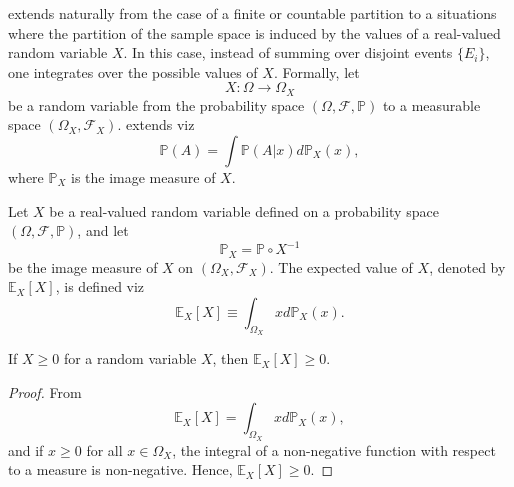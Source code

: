 \begin{remark}
	 extends naturally from the case of a finite or countable partition to a situations where the partition of the sample space is induced by the values of a real-valued random variable $X$. In this case, instead of summing over disjoint events $\{E_i\}$, one integrates over the possible values of $X$. Formally, let 
	\begin{equation}
		X: \Omega \to \Omega_X
	\end{equation}
	be a random variable from the probability space $(\Omega, \mathcal{F}, \mathbb{P})$ to a measurable space $(\Omega_X, \mathcal{F}_X)$.  extends viz
	\begin{equation}
		\mathbb{P}(A) = \int \mathbb{P}(A | x) d\mathbb{P}_X(x),
	\end{equation}
	where $\mathbb{P}_X$ is the image measure of $X$. 
\end{remark}

\begin{definition}
	\label{def:expectation_image}
	Let $X$ be a real-valued random variable defined on a probability space $(\Omega, \mathcal{F},\mathbb{P})$, and let
	\begin{equation}
		\mathbb{P}_X = \mathbb{P} \circ X^{-1}
	\end{equation} 
	be the image measure of $X$ on $(\Omega_X, \mathcal{F}_X)$. The expected value of $X$, denoted by $\mathbb{E}_X[X]$, is defined viz
	\begin{equation}
		\mathbb{E}_X[X] \equiv \int_{\Omega_X} x d\mathbb{P}_X(x).
		\label{eq:expected_value_image}
	\end{equation}
\end{definition}

\begin{theorem}
	If $X\geq 0$ for a random variable $X$, then $\mathbb{E}_X[X]\geq 0$.
\end{theorem}
\begin{proof}
	From  
	\begin{equation}
		\mathbb{E}_X[X] = \int_{\Omega_X}x d\mathbb{P}_X(x),
	\end{equation}
	and if $x \ge 0$ for all $x \in \Omega_X$, the integral of a non-negative function with respect to a measure is non-negative. Hence, $\mathbb{E}_X[X] \ge 0$.
\end{proof}


